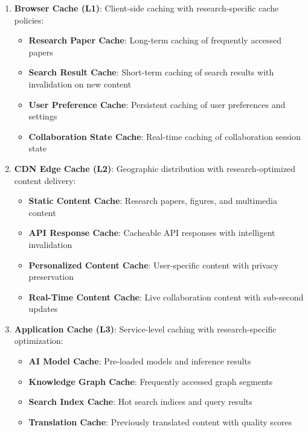 \documentclass[10pt,twocolumn]{article}
\begin{document}
\begin{enumerate}
    \item \textbf{Browser Cache (L1)}: Client-side caching with research-specific cache policies:
    \begin{itemize}
        \item \textbf{Research Paper Cache}: Long-term caching of frequently accessed papers
        \item \textbf{Search Result Cache}: Short-term caching of search results with invalidation on new content
        \item \textbf{User Preference Cache}: Persistent caching of user preferences and settings
        \item \textbf{Collaboration State Cache}: Real-time caching of collaboration session state
    \end{itemize}
    
    \item \textbf{CDN Edge Cache (L2)}: Geographic distribution with research-optimized content delivery:
    \begin{itemize}
        \item \textbf{Static Content Cache}: Research papers, figures, and multimedia content
        \item \textbf{API Response Cache}: Cacheable API responses with intelligent invalidation
        \item \textbf{Personalized Content Cache}: User-specific content with privacy preservation
        \item \textbf{Real-Time Content Cache}: Live collaboration content with sub-second updates
    \end{itemize}
    
    \item \textbf{Application Cache (L3)}: Service-level caching with research-specific optimization:
    \begin{itemize}
        \item \textbf{AI Model Cache}: Pre-loaded models and inference results
        \item \textbf{Knowledge Graph Cache}: Frequently accessed graph segments
        \item \textbf{Search Index Cache}: Hot search indices and query results
        \item \textbf{Translation Cache}: Previously translated content with quality scores
    \end{itemize}
    

\end{enumerate}
\end{document}
